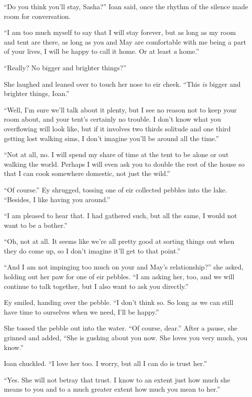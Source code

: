 ``Do you think you'll stay, Sasha?'' Ioan said, once the rhythm of the silence made room for conversation.

``I am too much myself to say that I will stay forever, but as long as my room and tent are there, as long as you and May are comfortable with me being a part of your lives, I will be happy to call it home. Or at least \emph{a} home.''

``Really? No bigger and brighter things?''

She laughed and leaned over to touch her nose to eir cheek. ``This \emph{is} bigger and brighter things, Ioan.''

``Well, I'm sure we'll talk about it plenty, but I see no reason not to keep your room about, and your tent's certainly no trouble. I don't know what you overflowing will look like, but if it involves two thirds solitude and one third getting lost walking sims, I don't imagine you'll be around all the time.''

``Not at all, no. I will spend my share of time at the tent to be alone or out walking the world. Perhaps I will even ask you to double the rest of the house so that I can cook somewhere domestic, not just the wild.''

``Of course.'' Ey shrugged, tossing one of eir collected pebbles into the lake. ``Besides, I like having you around.''

``I am pleased to hear that. I had gathered such, but all the same, I would not want to be a bother.''

``Oh, not at all. It seems like we're all pretty good at sorting things out when they do come up, so I don't imagine it'll get to that point.''

``And I am not impinging too much on your and May's relationship?'' she asked, holding out her paw for one of eir pebbles. ``I am asking her, too, and we will continue to talk together, but I also want to ask you directly.''

Ey smiled, handing over the pebble. ``I don't think so. So long as we can still have time to ourselves when we need, I'll be happy.''

She tossed the pebble out into the water. ``Of course, dear.'' After a pause, she grinned and added, ``She is gushing about you now. She loves you very much, you know.''

Ioan chuckled. ``I love her too. I worry, but all I can do is trust her.''

``Yes. She will not betray that trust. I know to an extent just how much she means to you and to a much greater extent how much you mean to her.''

